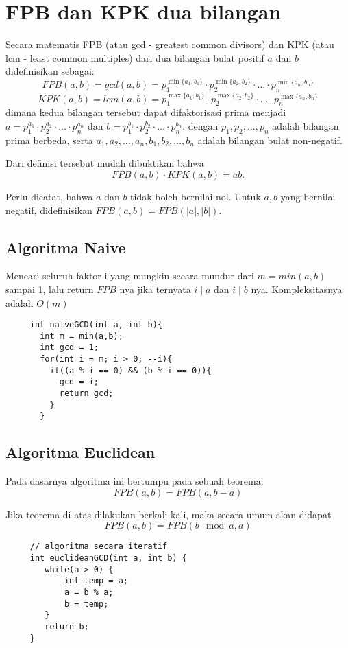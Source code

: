 	
  	\section{FPB dan KPK dua bilangan}
	 Secara matematis FPB (atau gcd - greatest common divisors) dan KPK (atau lcm - least common multiples) dari dua bilangan bulat positif $a$ dan $b$ 
	 didefinisikan sebagai:
	 $$FPB(a,b) = gcd(a,b) = p_1^{\min\{a_1,b_1\}}\cdot p_2^{\min\{a_2,b_2\}} \cdot \ldots \cdot p_n^{\min\{a_n,b_n\}}$$
	 $$KPK(a,b) = lcm(a,b) =p_1^{\max\{a_1,b_1\}}\cdot p_2^{\max\{a_2,b_2\}} \cdot \ldots \cdot p_n^{\max\{a_n,b_n\}}$$
	 dimana kedua bilangan tersebut dapat difaktorisasi prima menjadi
	 $a=p_1^{a_1}\cdot p_2^{a_2}\cdot \ldots \cdot p_n^{a_n}$ dan $b=p_1^{b_1}\cdot p_2^{b_2} \cdot \ldots \cdot p_n^{b_n}$, dengan $p_1,p_2,\dots,p_n$ adalah bilangan prima berbeda, serta $a_1,a_2,\dots,a_n,b_1,b_2,\dots,b_n$ adalah bilangan bulat non-negatif.
	 
	 Dari definisi tersebut mudah dibuktikan bahwa
	 $$FPB(a,b) \cdot KPK(a,b) = ab.$$
	 
	 Perlu dicatat, bahwa $a$ dan $b$ tidak boleh bernilai nol. Untuk $a,b$ yang bernilai negatif, didefinisikan $FPB(a,b) = FPB(|a|,|b|)$.
	 
	 \subsection{Algoritma Naive}
	 Mencari seluruh faktor i yang mungkin secara mundur dari $m = min(a,b)$ sampai 1, lalu return $FPB$ nya jika ternyata $i \mid a$ dan $i \mid b$ nya. Kompleksitasnya adalah $O(m)$
	 
	 \begin{lstlisting}
	 int naiveGCD(int a, int b){
	   int m = min(a,b);
	   int gcd = 1;
	   for(int i = m; i > 0; --i){
	     if((a % i == 0) && (b % i == 0)){
	       gcd = i;
	       return gcd;
	     }
	   }
	 \end{lstlisting}
	 
	 
	 \subsection{Algoritma Euclidean}
	 Pada dasarnya algoritma ini bertumpu pada sebuah teorema:
	 $$FPB(a,b) = FPB(a,b-a)$$
	 
	 Jika teorema di atas dilakukan berkali-kali, maka secara umum akan didapat
	 $$FPB(a,b) = FPB(b\mod a , a)$$
	 
	 \begin{lstlisting}
	 // algoritma secara iteratif
	 int euclideanGCD(int a, int b) {
	   	while(a > 0) {
	   		int temp = a;
	   		a = b % a;
	   		b = temp;
	 	}
	 	return b;
	 }
	 \end{lstlisting}
	
